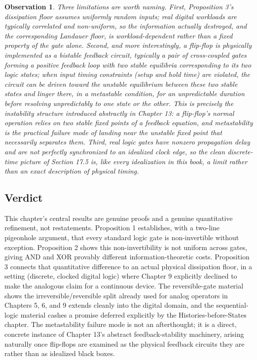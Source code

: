 \documentclass[12pt]{article}
\newtheorem{observation}{Observation}
\begin{document}
\begin{observation}
Three limitations are worth naming. First, Proposition 3's dissipation floor assumes uniformly random inputs; real digital workloads are typically correlated and non-uniform, so the information actually destroyed, and the corresponding Landauer floor, is workload-dependent rather than a fixed property of the gate alone. Second, and more interestingly, a flip-flop is physically implemented as a bistable feedback circuit, typically a pair of cross-coupled gates forming a positive feedback loop with two stable equilibria corresponding to its two logic states; when input timing constraints (setup and hold time) are violated, the circuit can be driven toward the unstable equilibrium between these two stable states and linger there, in a metastable condition, for an unpredictable duration before resolving unpredictably to one state or the other. This is precisely the instability structure introduced abstractly in Chapter 13: a flip-flop's normal operation relies on two stable fixed points of a feedback equation, and metastability is the practical failure mode of landing near the unstable fixed point that necessarily separates them. Third, real logic gates have nonzero propagation delay and are not perfectly synchronized to an idealized clock edge, so the clean discrete-time picture of Section 17.5 is, like every idealization in this book, a limit rather than an exact description of physical timing.
\end{observation}

\subsection{Verdict}

This chapter's central results are genuine proofs and a genuine quantitative refinement, not restatements. Proposition 1 establishes, with a two-line pigeonhole argument, that every standard logic gate is non-invertible without exception. Proposition 2 shows this non-invertibility is not uniform across gates, giving AND and XOR provably different information-theoretic costs. Proposition 3 connects that quantitative difference to an actual physical dissipation floor, in a setting (discrete, clocked digital logic) where Chapter 9 explicitly declined to make the analogous claim for a continuous device. The reversible-gate material shows the irreversible/reversible split already used for analog operators in Chapters 5, 6, and 9 extends cleanly into the digital domain, and the sequential-logic material cashes a promise deferred explicitly by the Histories-before-States chapter. The metastability failure mode is not an afterthought; it is a direct, concrete instance of Chapter 13's abstract feedback-stability machinery, arising naturally once flip-flops are examined as the physical feedback circuits they are rather than as idealized black boxes.
\end{document}
